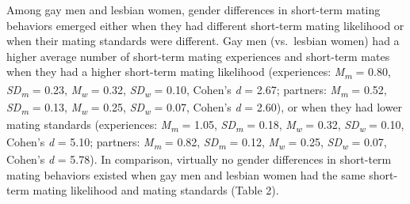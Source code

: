 \documentclass[
  11pt,
]{article}
\begin{document}
Among gay men and lesbian women, gender differences in short-term mating
behaviors emerged either when they had different short-term mating
likelihood or when their mating standards were different. Gay men
(vs.~lesbian women) had a higher average number of short-term mating
experiences and short-term mates when they had a higher short-term
mating likelihood (experiences: \emph{M\textsubscript{m}} = 0.80,
\emph{SD\textsubscript{m}} = 0.23, \emph{M\textsubscript{w}} = 0.32,
\emph{SD\textsubscript{w}} = 0.10, Cohen's \emph{d} = 2.67; partners:
\emph{M\textsubscript{m}} = 0.52, \emph{SD\textsubscript{m}} = 0.13,
\emph{M\textsubscript{w}} = 0.25, \emph{SD\textsubscript{w}} = 0.07,
Cohen's \emph{d} = 2.60), or when they had lower mating standards
(experiences: \emph{M\textsubscript{m}} = 1.05,
\emph{SD\textsubscript{m}} = 0.18, \emph{M\textsubscript{w}} = 0.32,
\emph{SD\textsubscript{w}} = 0.10, Cohen's \emph{d} = 5.10; partners:
\emph{M\textsubscript{m}} = 0.82, \emph{SD\textsubscript{m}} = 0.12,
\emph{M\textsubscript{w}} = 0.25, \emph{SD\textsubscript{w}} = 0.07,
Cohen's \emph{d} = 5.78). In comparison, virtually no gender differences
in short-term mating behaviors existed when gay men and lesbian women
had the same short-term mating likelihood and mating standards (Table
2).
\end{document}
